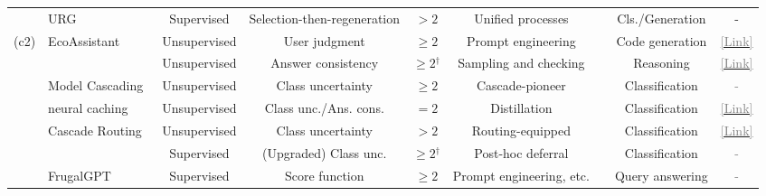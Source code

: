 \documentclass{article}
\newcommand{\cmark}{\ding{51}}%
\begin{document}
\begin{table}[t]
{\begin{threeparttable}
{\begin{tabular}{llcc c c c c c }
&URG~\cite{lv2024urg}  & Supervised & Selection-then-regeneration & $ >  2$ & Unified processes &\cmark & Cls./Generation & -\\
\cmidrule{2-9} 
\multirow{10}{*}{(c2)}  & \cellcolor[rgb]{ .867, .922, .969}EcoAssistant~\cite{zhang2023ecoassistant} 	& \cellcolor[rgb]{ .867, .922, .969}Unsupervised & \cellcolor[rgb]{ .867, .922, .969}User judgment & \cellcolor[rgb]{ .867, .922, .969}$\geq 2$ & \cellcolor[rgb]{ .867, .922, .969}Prompt engineering & \cellcolor[rgb]{ .867, .922, .969}\cmark & \cellcolor[rgb]{ .867, .922, .969}Code generation & \cellcolor[rgb]{ .867, .922, .969}\href{https://github.com/JieyuZ2/EcoAssistant}{\textcolor{gray}{[Link]}}\\
&  \cite{yuelarge}  & Unsupervised  & Answer consistency & $\geq 2$$^{\dag}$ &Sampling and checking &\cmark  &Reasoning & \href{https://github.com/MurongYue/LLM_MoT_cascade}{\textcolor{gray}{[Link]}}\\
&  \cellcolor[rgb]{ .867, .922, .969}Model Cascading~\cite{varshney2022model}	& \cellcolor[rgb]{ .867, .922, .969}Unsupervised & \cellcolor[rgb]{ .867, .922, .969}Class uncertainty &  \cellcolor[rgb]{ .867, .922, .969}$\geq 2$  & \cellcolor[rgb]{ .867, .922, .969}Cascade-pioneer &\cellcolor[rgb]{ .867, .922, .969}\cmark & \cellcolor[rgb]{ .867, .922, .969}Classification & \cellcolor[rgb]{ .867, .922, .969}\textcolor{gray}{-}\\
&   neural caching~\cite{ramirez2023cache}	& Unsupervised & Class unc./Ans. cons. & $= 2$  & Distillation  & \cmark &Classification  & \href{https://github.com/guillemram97/neural-caching}{\textcolor{gray}{[Link]}} \\

&  \cellcolor[rgb]{ .867, .922, .969}Cascade Routing~\cite{dekoninck2024unified}	& \cellcolor[rgb]{ .867, .922, .969}Unsupervised & \cellcolor[rgb]{ .867, .922, .969}Class uncertainty  & \cellcolor[rgb]{ .867, .922, .969}$>2$  &\cellcolor[rgb]{ .867, .922, .969}Routing-equipped &\cellcolor[rgb]{ .867, .922, .969}\cmark  &\cellcolor[rgb]{ .867, .922, .969}Classification  &\cellcolor[rgb]{ .867, .922, .969}\href{https://github.com/eth-sri/cascade-routing}{\textcolor{gray}{[Link]}} \\

&  \cite{jitkrittum2024does}	& Supervised & (Upgraded) Class unc. & $\geq2$$^{\dag}$ & Post-hoc deferral & \cmark & Classification & \textcolor{gray}{-} \\

&  \cellcolor[rgb]{ .867, .922, .969}FrugalGPT~\cite{chen2023frugalgpt} 	& \cellcolor[rgb]{ .867, .922, .969}Supervised &  \cellcolor[rgb]{ .867, .922, .969}Score function  &\cellcolor[rgb]{ .867, .922, .969}$\geq2$& \cellcolor[rgb]{ .867, .922, .969}Prompt engineering, etc.& \cellcolor[rgb]{ .867, .922, .969}\cmark &  \cellcolor[rgb]{ .867, .922, .969}Query answering &\cellcolor[rgb]{ .867, .922, .969}\textcolor{gray}{-}\\


\end{tabular}}
\end{threeparttable}}
\end{table}
\end{document}
